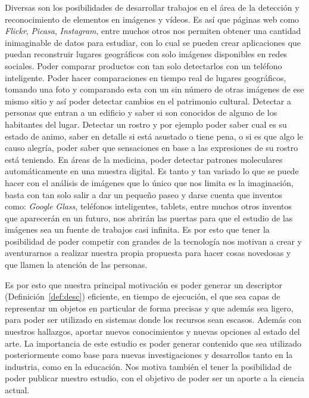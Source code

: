 Diversas son los posibilidades de desarrollar trabajos en el área de la detección y reconocimiento de elementos en imágenes y vídeos. Es así que páginas web como \textit{Flickr}, \textit{Picasa}, \textit{Instagram}, entre muchos otros nos permiten obtener una cantidad inimaginable de datos para estudiar, con lo cual se pueden crear aplicaciones que puedan reconstruir lugares geográficos con solo imágenes disponibles en redes sociales. Poder comparar productos con tan solo detectarlos con un teléfono inteligente. Poder hacer comparaciones en tiempo real de lugares geográficos, tomando una foto y comparando esta con un sin número de otras imágenes de ese mismo sitio y así poder detectar cambios en el patrimonio cultural. Detectar a personas que entran a un edificio y saber si son conocidos de alguno de los habitantes del lugar. Detectar un rostro y por ejemplo poder saber cual es su estado de animo, saber en detalle si está asustado o tiene pena, o si es que algo le causo alegría, poder saber que sensaciones en base a las expresiones de su rostro está teniendo. En áreas de la medicina, poder detectar patrones moleculares automáticamente en una muestra digital. Es tanto y tan variado lo que se puede hacer con el análisis de imágenes que lo único que nos limita es la imaginación, basta con tan solo salir a dar un pequeño paseo y darse cuenta que inventos como: \textit{Google} \textit{Glass}, teléfonos inteligentes, tablets, entre muchos otros inventos que aparecerán en un futuro, nos abrirán las puertas para que el estudio de las imágenes sea un fuente de trabajos casi infinita. Es por esto que tener la posibilidad de poder competir con grandes de la tecnología nos motivan a crear y aventurarnos a realizar nuestra propia propuesta para hacer cosas novedosas y que llamen la atención de las personas.

Es por esto que nuestra principal motivación es poder generar un descriptor (Definición~\ref{def:desc}) eficiente, en tiempo de ejecución, el que sea capas de representar un objetos en particular de forma precisas y que además sea ligero, para poder ser utilizado en sistemas donde los recursos sean escasos. Además con nuestros hallazgos, aportar nuevos conocimientos y nuevas opciones al estado del arte. La importancia de este estudio es poder generar contenido que sea utilizado posteriormente como base para nuevas investigaciones y desarrollos tanto en la industria, como en la educación. Nos motiva también el tener la posibilidad de poder publicar nuestro estudio, con el objetivo de poder ser un aporte a la ciencia actual.

